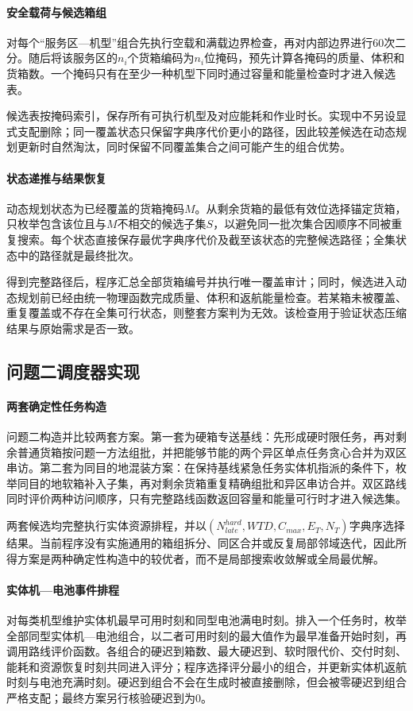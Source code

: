 \paragraph{安全载荷与候选箱组}
对每个“服务区—机型”组合先执行空载和满载边界检查，再对内部边界进行60次二分。随后将该服务区的$n_i$个货箱编码为$n_i$位掩码，预先计算各掩码的质量、体积和货箱数。一个掩码只有在至少一种机型下同时通过容量和能量检查时才进入候选表。

候选表按掩码索引，保存所有可执行机型及对应能耗和作业时长。实现中不另设显式支配删除；同一覆盖状态只保留字典序代价更小的路径，因此较差候选在动态规划更新时自然淘汰，同时保留不同覆盖集合之间可能产生的组合优势。

\paragraph{状态递推与结果恢复}
动态规划状态为已经覆盖的货箱掩码$M$。从剩余货箱的最低有效位选择锚定货箱，只枚举包含该位且与$M$不相交的候选子集$S$，以避免同一批次集合因顺序不同被重复搜索。每个状态直接保存最优字典序代价及截至该状态的完整候选路径；全集状态中的路径就是最终批次。

得到完整路径后，程序汇总全部货箱编号并执行唯一覆盖审计；同时，候选进入动态规划前已经由统一物理函数完成质量、体积和返航能量检查。若某箱未被覆盖、重复覆盖或不存在全集可行状态，则整套方案判为无效。该检查用于验证状态压缩结果与原始需求是否一致。

\subsection{问题二调度器实现}
\paragraph{两套确定性任务构造}
问题二构造并比较两套方案。第一套为硬箱专送基线：先形成硬时限任务，再对剩余普通货箱按问题一方法组批，并把能够节能的两个异区单点任务贪心合并为双区串访。第二套为同目的地混装方案：在保持基线紧急任务实体机指派的条件下，枚举同目的地软箱补入子集，再对剩余货箱重复精确组批和异区串访合并。双区路线同时评价两种访问顺序，只有完整路线函数返回容量和能量可行时才进入候选集。

两套候选均完整执行实体资源排程，并以$(N_{late}^{hard},WTD,C_{max},E_T,N_T)$字典序选择结果。当前程序没有实施通用的箱组拆分、同区合并或反复局部邻域迭代，因此所得方案是两种确定性构造中的较优者，而不是局部搜索收敛解或全局最优解。

\paragraph{实体机—电池事件排程}
对每类机型维护实体机最早可用时刻和同型电池满电时刻。排入一个任务时，枚举全部同型实体机—电池组合，以二者可用时刻的最大值作为最早准备开始时刻，再调用路线评价函数。各组合的硬迟到箱数、最大硬迟到、软时限代价、交付时刻、能耗和资源恢复时刻共同进入评分；程序选择评分最小的组合，并更新实体机返航时刻与电池充满时刻。硬迟到组合不会在生成时被直接删除，但会被零硬迟到组合严格支配；最终方案另行核验硬迟到为0。

